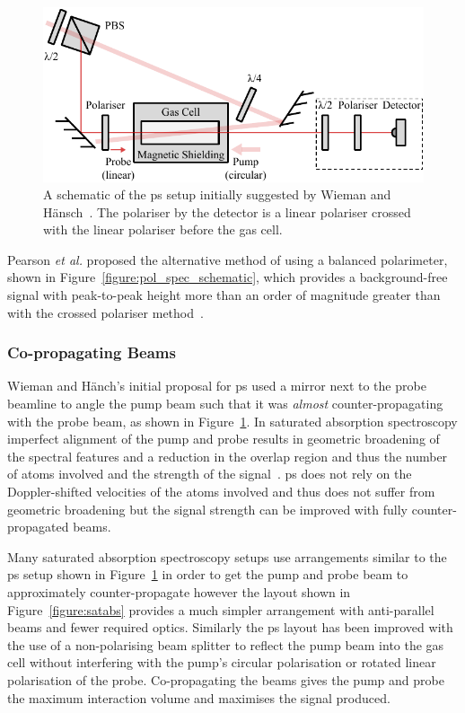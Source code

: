 \begin{figure}
\center
\includegraphics{part1/Figs/PolSpecWieman.pdf}
\caption[Polarisation spectroscopy setup as suggested by Wieman and H\"ansch in 1976.]{A schematic of the \gls{ps} setup initially suggested by Wieman and H\"ansch~\cite{wieman_doppler-free_1976}. The polariser by the detector is a linear polariser crossed with the linear polariser before the gas cell.}
\label{figure:wieman_doppler-free_schematic}
\end{figure}

Pearson \emph{et al.} proposed the alternative method of using a balanced polarimeter, shown in Figure~\ref{figure:pol_spec_schematic}, which provides a background-free signal with peak-to-peak height more than an order of magnitude greater than with the crossed polariser method~\cite{pearman_polarization_2002,yoshikawa_frequency_2003}.

\subsubsection{Co-propagating Beams}

Wieman and H\"anch's initial proposal for \gls{ps} used a mirror next to the probe beamline to angle the pump beam such that it was \emph{almost} counter-propagating with the probe beam, as shown in Figure~\ref{figure:wieman_doppler-free_schematic}.
In saturated absorption spectroscopy imperfect alignment of the pump and probe results in geometric broadening of the spectral features and a reduction in the overlap region and thus the number of atoms involved and the strength of the signal~\cite{himsworth_rubidium_2010}.
\Gls{ps} does not rely on the Doppler-shifted velocities of the atoms involved and thus does not suffer from geometric broadening but the signal strength can be improved with fully counter-propagated beams.

Many saturated absorption spectroscopy setups use arrangements similar to the \gls{ps} setup shown in Figure~\ref{figure:wieman_doppler-free_schematic} in order to get the pump and probe beam to approximately counter-propagate however the layout shown in Figure~\ref{figure:satabs} provides a much simpler arrangement with anti-parallel beams and fewer required optics.
Similarly the \gls{ps} layout has been improved with the use of a non-polarising beam splitter to reflect the pump beam into the gas cell without interfering with the pump's circular polarisation or rotated linear polarisation of the probe.
Co-propagating the beams gives the pump and probe the maximum interaction volume and maximises the signal produced.

